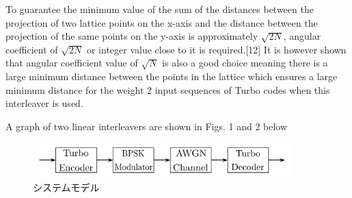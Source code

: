 \documentclass[20 pts]{article}
\begin{document}
To guarantee the minimum value of the sum of the distances between the projection of two lattice points on the x-axis and the distance between the projection of the same points on the y-axis is approximately $\sqrt{2N}$, angular coefficient of $\sqrt{2N}$ or integer value close to it is required.[12]  It is however shown that angular coefficient value of $\sqrt{N} $ is also a good choice meaning there is a large minimum distance between the points in the lattice which ensures a large minimum distance for the weight 2 input sequences of Turbo codes when this interleaver is used.



A graph of two linear interleavers are shown in Figs. 1 and 2 below
\begin{figure}[h!]
\includegraphics[width=10cm]{figure4.pdf}
\caption{システムモデル}
\label{}
\end{figure}
\end{document}
